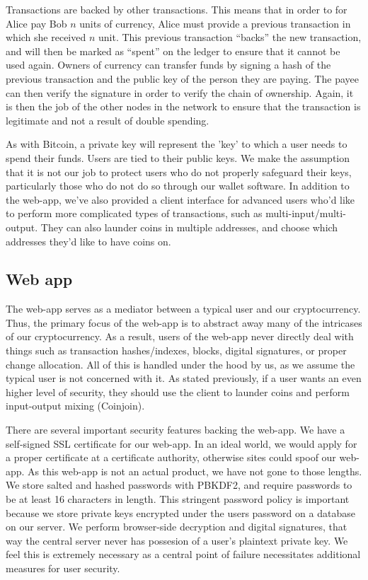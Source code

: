 \documentclass[12pt]{article}
\begin{document}
Transactions are backed by other transactions. This means that in order to for Alice pay Bob $n$ units of currency, Alice must provide a previous transaction in which she received $n$ unit. This previous transaction ``backs'' the new transaction, and will then be marked as ``spent'' on the ledger to ensure that it cannot be used again. Owners of currency can transfer funds by signing a hash of the previous transaction and the public key of the person they are paying. The payee can then verify the signature in order to verify the chain of ownership. Again, it is then the job of the other nodes in the network to ensure that the transaction is legitimate and not a result of double spending.

As with Bitcoin, a private key will represent the 'key' to which a user needs to spend their funds. Users are tied to their public keys. We make the assumption that it is not our job to protect users who do not properly safeguard their keys, particularly those who do not do so through our wallet software. In addition to the web-app, we've also provided a client interface for advanced users who'd like to perform more complicated types of transactions, such as multi-input/multi-output. They can also launder coins in multiple addresses, and choose which addresses they'd like to have coins on.

\subsection*{Web app}

The web-app serves as a mediator between a typical user and our cryptocurrency. Thus, the primary focus of the web-app is to abstract away many of the intricases of our cryptocurrency. As a result, users of the web-app never directly deal with things such as transaction hashes/indexes, blocks, digital signatures, or proper change allocation. All of this is handled under the hood by us, as we assume the typical user is not concerned with it. As stated previously, if a user wants an even higher level of security, they should use the client to launder coins and perform input-output mixing (Coinjoin).

There are several important security features backing the web-app. We have a self-signed SSL certificate for our web-app. In an ideal world, we would apply for a proper certificate at a certificate authority, otherwise sites could spoof our web-app. As this web-app is not an actual product, we have not gone to those lengths. We store salted and hashed passwords with PBKDF2, and require passwords to be at least 16 characters in length. This stringent password policy is important because we store private keys encrypted under the users password on a database on our server. We perform browser-side decryption and digital signatures, that way the central server never has possesion of a user's plaintext private key. We feel this is extremely necessary as a central point of failure necessitates additional measures for user security.
\end{document}
